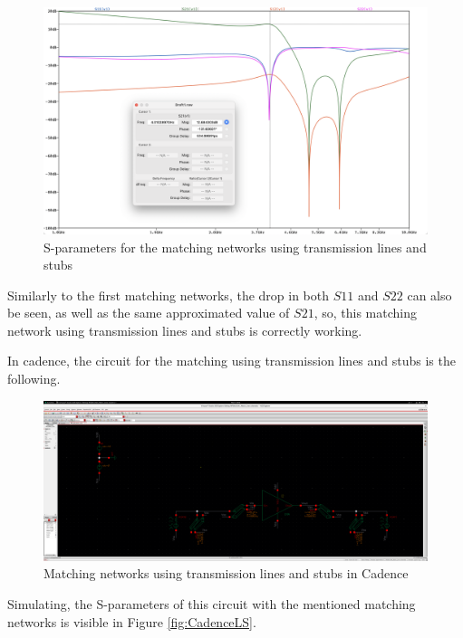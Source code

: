 \begin{figure}[H]
    \centering
    \includegraphics*[scale = 0.3]{Images/SIMLSmatching.png}
    \caption{S-parameters for the matching networks using transmission lines and stubs}
    \label{fig:SIMLSMatching}
\end{figure}

Similarly to the first matching networks, the drop in both $S11$ and $S22$ can also be seen, as well as the same approximated value of $S21$, so, this matching network using transmission lines and stubs is correctly working. 

In cadence, the circuit for the matching using transmission lines and stubs is the following.

\begin{figure}[H]
    \centering
    \includegraphics*[scale = 0.1]{Images/CadenceLScircuit.png}
    \caption{Matching networks using transmission lines and stubs in Cadence}
    \label{fig:CadenceLCcircuit}
\end{figure}

Simulating, the S-parameters of this circuit with the mentioned matching networks is visible in Figure \ref{fig:CadenceLS}.

